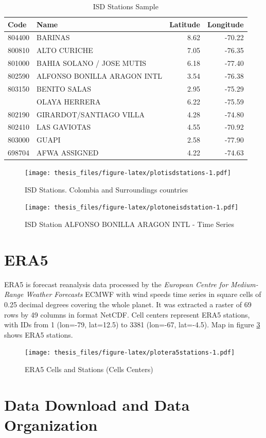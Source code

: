 \documentclass[12pt,oneside]{reedthesis}
\begin{document}
\begingroup\fontsize{10}{12}\selectfont
\begin{longtable}[t]{llrr}
\caption[ISD Stations Sample]{\label{tab:tableisdstations}ISD Stations Sample}\\
\toprule
Code & Name & Latitude & Longitude\\
\midrule
804400 & BARINAS & 8.62 & -70.22\\
800810 & ALTO CURICHE & 7.05 & -76.35\\
801000 & BAHIA SOLANO / JOSE MUTIS & 6.18 & -77.40\\
802590 & ALFONSO BONILLA ARAGON INTL & 3.54 & -76.38\\
803150 & BENITO SALAS & 2.95 & -75.29\\
\addlinespace
801100 & OLAYA HERRERA & 6.22 & -75.59\\
802190 & GIRARDOT/SANTIAGO VILLA & 4.28 & -74.80\\
802410 & LAS GAVIOTAS & 4.55 & -70.92\\
803000 & GUAPI & 2.58 & -77.90\\
698704 & AFWA ASSIGNED & 4.22 & -74.63\\
\bottomrule
\end{longtable}
\endgroup{}
\begin{figure}
\centering
\texttt{[image: thesis\_files/figure-latex/plotisdstations-1.pdf]}
\caption{\label{fig:plotisdstations}ISD Stations. Colombia and Surroundings countries}
\end{figure}
\begin{figure}
\centering
\texttt{[image: thesis\_files/figure-latex/plotoneisdstation-1.pdf]}
\caption{\label{fig:plotoneisdstation}ISD Station ALFONSO BONILLA ARAGON INTL - Time Series}
\end{figure}
\hypertarget{era5}{%
\section{ERA5}\label{era5}}

ERA5 is forecast reanalysis data processed by the \emph{European Centre for Medium-Range Weather Forecasts} ECMWF with wind speeds time series in square cells of 0.25 decimal degrees covering the whole planet. It was extracted a raster of 69 rows by 49 columns in format NetCDF. Cell centers represent ERA5 stations, with IDs from 1 (lon=-79, lat=12.5) to 3381 (lon=-67, lat=-4.5). Map in figure \ref{fig:plotera5stations} shows ERA5 stations.
\begin{figure}
\centering
\texttt{[image: thesis\_files/figure-latex/plotera5stations-1.pdf]}
\caption{\label{fig:plotera5stations}ERA5 Cells and Stations (Cells Centers)}
\end{figure}
\hypertarget{data-download-and-data-organization}{%
\section{Data Download and Data Organization}\label{data-download-and-data-organization}}
\end{document}
